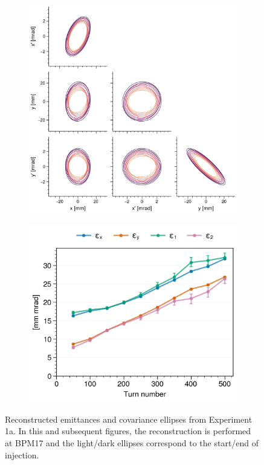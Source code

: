 \begin{figure}[!p]
    \centering
    \begin{subfigure}{0.6\textwidth}
        \includegraphics[width=\textwidth]{Images/chapter5/exp1a/corner.png}
    \end{subfigure}
    \hfill
    \begin{subfigure}[t]{0.39\textwidth}
        \includegraphics[width=\textwidth]{Images/chapter5/exp1a/emittances.png}
    \end{subfigure}
    \caption{Reconstructed emittances and covariance ellipses from Experiment 1a. In this and subsequent figures, the reconstruction is performed at BPM17 and the light/dark ellipses correspond to the start/end of injection.}
    \label{fig:exp1a_emittances}
\end{figure}
